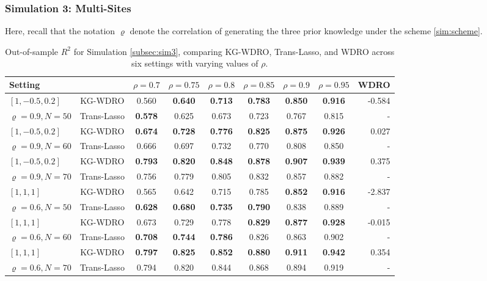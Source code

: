 \documentclass[12pt]{article}
\begin{document}
\subsubsection{Simulation 3: Multi-Sites}
Here, recall that the notation $\varrho$ denote the correlation of generating the three prior knowledge under the scheme \eqref{sim:scheme}.
\begin{table}[H]
\begin{center}
\setlength{\tabcolsep}{4pt} %
\renewcommand{\arraystretch}{1.1} %
\begin{small}
\begin{sc}
\begin{tabular}{l|c|cccccc|r}
\toprule
Setting & & $\rho = 0.7$ & $\rho = 0.75$ & $\rho = 0.8$ & $\rho = 0.85$ & $\rho = 0.9$ & $\rho = 0.95$ & WDRO\\
\midrule
$[1,-0.5,0.2]$ & KG-WDRO & 0.560 & \textbf{0.640} & \textbf{0.713} & \textbf{0.783} & \textbf{0.850} & \textbf{0.916} & -0.584\\
$\varrho = 0.9,N=50$        & Trans-Lasso & \textbf{0.578} & 0.625 & 0.673 & 0.723 & 0.767 & 0.815 & - \\
\midrule
$[1,-0.5,0.2]$ & KG-WDRO & \textbf{0.674} & \textbf{0.728} & \textbf{0.776} & \textbf{0.825} & \textbf{0.875} & \textbf{0.926} & 0.027\\
$\varrho = 0.9,N=60$    & Trans-Lasso & 0.666 & 0.697 & 0.732 & 0.770 & 0.808 & 0.850 & -\\
\midrule
$[1,-0.5,0.2]$ & KG-WDRO & \textbf{0.793} & \textbf{0.820} & \textbf{0.848} & \textbf{0.878} & \textbf{0.907} & \textbf{0.939} & 0.375\\
$\varrho = 0.9,N=70$    & Trans-Lasso & 0.756 & 0.779 & 0.805 & 0.832 & 0.857 & 0.882 & -\\
\midrule
$[1,1,1]$ & KG-WDRO & 0.565 & 0.642 & 0.715 & 0.785 & \textbf{0.852} & \textbf{0.916} & -2.837\\
$\varrho = 0.6, N=50$    & Trans-Lasso & \textbf{0.628} & \textbf{0.680} & \textbf{0.735} & \textbf{0.790} & {0.838} & {0.889} & - \\
\midrule
$[1,1,1]$ & KG-WDRO & 0.673 & 0.729 & 0.778 & \textbf{0.829} & \textbf{0.877} & \textbf{0.928} & -0.015\\
$\varrho = 0.6, N=60$    & Trans-Lasso & \textbf{0.708} & \textbf{0.744} & \textbf{0.786} & {0.826} & {0.863} & {0.902} & - \\
\midrule
$[1,1,1]$ & KG-WDRO & \textbf{0.797} & \textbf{0.825} & \textbf{0.852} & \textbf{0.880} & \textbf{0.911} & \textbf{0.942} & 0.354\\
$\varrho = 0.6, N=70$    & Trans-Lasso & {0.794} & {0.820} & {0.844} & {0.868} & {0.894} & {0.919} & - \\
\bottomrule
\end{tabular}
\end{sc}
\end{small}
\end{center}
\caption{Out-of-sample $R^2$ for Simulation \ref{subsec:sim3}, comparing KG-WDRO, Trans-Lasso, and WDRO across six settings with varying values of $\rho$.}
\label{tab:sim3}
\end{table}
\end{document}
